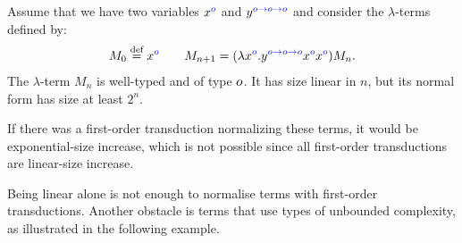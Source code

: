 \begin{example}\label{ex:exponential}
    Assume that we have two variables ${x}^{{\color{blue}o}}$ and ${y}^{{\color{blue}o \to o \to o}}$ and consider the $\lambda$-terms defined by:
    \begin{align*}
        M_0 \stackrel{\text{def}}= {x}^{{\color{blue}o}} \qquad M_{n+1} = (\lambda {x}^{{\color{blue}o}} . {y}^{{\color{blue}o \to o \to o}}  {x}^{{\color{blue}o}} {x}^{{\color{blue}o}})M_n.
    \end{align*}
    The $\lambda$-term $M_n$ is well-typed and of type $o$. It has size linear in $n$, but its normal form has size at least $2^n$. 
\end{example}
If there was a first-order transduction normalizing these terms, it would be exponential-size increase, which is not possible since all first-order transductions are linear-size increase. 

Being linear alone is not enough to normalise terms with first-order transductions. Another obstacle is terms that use types of unbounded complexity, as illustrated in the following example. 

